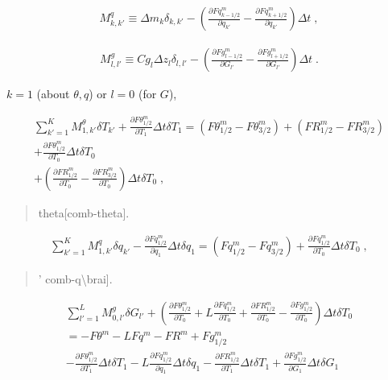 \begin{eqnarray}
M^{q}_{k,k'} \equiv \Delta m_k \delta_{k,k'}
          -  \left(  \frac{\partial Fq^{m}_{k-1/2}}{\partial q_{k'}}
                   - \frac{\partial Fq^{m}_{k+1/2}}{\partial q_{k'}} \right) \Delta t \; ,
\end{eqnarray}

\begin{eqnarray}
M^{g}_{l,l'} \equiv Cg_l \Delta z_l \delta_{l,l'}
          -  \left(  \frac{\partial Fg^{m}_{l-1/2}}{\partial G_{l'}}
                   - \frac{\partial Fg^{m}_{l+1/2}}{\partial G_{l'}} \right) \Delta t \; .
\end{eqnarray}

\(k=1\) (about \(\theta, q\)) or \(l=0\) (for \(G\)),

\begin{eqnarray}
    \sum_{k'=1}^{K}  M^\theta_{1,k'} \delta T_{k'}
  +  \frac{\partial F\theta^{m}_{1/2}}{\partial T_1} \Delta t\delta T_1
        =  (F\theta^{m}_{1/2} - F\theta^{m}_{3/2})
        + (FR^{m}_{1/2} - FR^{m}_{3/2})   \\
 +   \frac{\partial F\theta^{m}_{1/2}}{\partial T_0} \Delta t\delta T_0
      \\
 +  \left(\frac{\partial FR^{m}_{1/2}}{\partial T_0} - \frac{\partial FR^{m}_{3/2}}{\partial T_0} \right)
     \Delta t\delta T_0 \; ,
\end{eqnarray}

\begin{quote}
\protect\hypertarget{comb-theta}{}{theta{[}comb-theta{]}}.
\end{quote}

\begin{eqnarray}
 \sum_{k'=1}^{K}  M^q_{1,k'} \delta q_{k'}
         - \frac{\partial Fq^{m}_{1/2}}{\partial q_1} \Delta t\delta q_1
         = (Fq^{m}_{1/2} - Fq^{m}_{3/2})
         + \frac{\partial Fq^{m}_{1/2}}{\partial T_0} \Delta t\delta T_0 \; ,
\end{eqnarray}

\begin{quote}
\protect\hypertarget{combo-q}{}{\blazin' comb-q\textbackslash brai{]}}.
\end{quote}

\begin{eqnarray}
  {\sum_{l'=1}^{L} M^g_{0,l'} \delta G_{l'}
           +  \left(    \frac{\partial F\theta^{m}_{1/2}}{\partial T_0}
           +  L \frac{\partial Fq^{m}_{1/2}}{\partial T_0}
           +    \frac{\partial FR^{m}_{1/2}}{\partial T_0}
           -  \frac{\partial Fg^{m}_{1/2}}{\partial T_0} \right) \Delta t\delta T_0  }
         \\
         =  - F\theta^{m} - L Fq^{m} - FR^{m} +  Fg^{m}_{1/2}  \\
         -    \frac{\partial F\theta^{m}_{1/2}}{\partial T_1} \Delta t\delta T_1
           -  L \frac{\partial Fq^{m}_{1/2}}{\partial q_1} \Delta t\delta q_1
           -    \frac{\partial FR^{m}_{1/2}}{\partial T_1} \Delta t\delta T_1
           +    \frac{\partial Fg^{m}_{1/2}}{\partial G_1} \Delta t\delta G_1  
\end{eqnarray}

